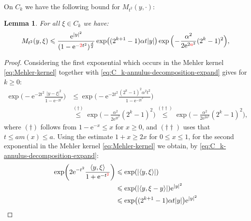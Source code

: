 \documentclass{amsart}
\newtheorem{lemma}{Lemma}
\theoremstyle{remark}
\newcommand{\la}{\langle}
\newcommand{\ra}{\rangle}
\renewcommand{\leq}{\leqslant}
\renewcommand{\leq}{\leqslant}
\renewcommand{\geq}{\geqslant}
\newcommand{\e}{\mathrm{e}} %
\renewcommand{\leq}{\leqslant}%
\renewcommand{\geq}{\geqslant}%
\newcommand{\red}{\color{red}}
\begin{document}
On $C_k$ we have the following bound for $M_{t^2}(y,\cdot)$:
\begin{lemma}\label{lem:On-diagonal-kernel-estimates-on-Ck}
  For all $\xi \in C_k$ we have:
  \begin{equation}
    M_{t^2}(y, \xi) \leq \frac{\e^{|y|^2}}{(1 - \e^{-{\red 2}{t^2}})^{\frac{d}2}}
    \exp\bigl((2^{k + 1} - 1) \alpha t |y| \bigr) \exp\Big(\!-\!\frac{\alpha^2}{2 \e^{2{\red a}^2}} (2^k - 1)^2 \Big),
  \end{equation}
\end{lemma}
\begin{proof}
  Considering the first
  exponential which occurs in the Mehler kernel
  \eqref{eq:Mehler-kernel} together with
  \eqref{eq:C_k-annulus-decomposition-expand} gives for $k \geq 0$:
  \begin{align*}
    \exp\biggl(-\e^{-2t^2} \frac{|y - \xi|^2}{1 - \e^{-2t^2}} \biggr)
    &\leq \exp\biggl(-\e^{-2t^2} \frac{(2^k - 1)^2 \alpha^2 t^2}{1 - \e^{-2t^2}} \biggr)\\
    &\overset{(\dagger)}{\leq} \exp\biggl(-\frac{\alpha^2}{2 \e^{2t^2}} (2^k - 1)^2 \biggr)
    \overset{(\dagger\dagger)}{\leq} \exp\biggl(-\frac{\alpha^2}{2 \e^{2a^2}} (2^k - 1)^2 \biggr),
  \end{align*}
  where $(\dagger)$ follows from $1 - \e^{-x} \leq x$ for $x \geq 0$, and $(\dagger\dagger)$
  uses that $t \leq am(x) \leq a$.
  Using the estimate $1+x \geq 2x$ for $0\leq x\leq1$, 
  for the second exponential in the Mehler kernel \eqref{eq:Mehler-kernel} we obtain,
  by \eqref{eq:C_k-annulus-decomposition-expand}:
  \begin{align*}
    \exp\biggl(2\e^{-t^2} \frac{\la y, \xi \ra}{1 + \e^{- t^{{\red 2}}}}
    \biggr)
    & \leq \exp(|\la y, \xi \ra|)\\
    & \leq \exp(|\langle y, \xi-y\rangle|) \e^{|y|^2}\\
    & \leq \exp\bigl((2^{k + 1} - 1) \alpha t |y| \bigr) \e^{|y|^2}
  \end{align*}

\end{proof}
\end{document}
